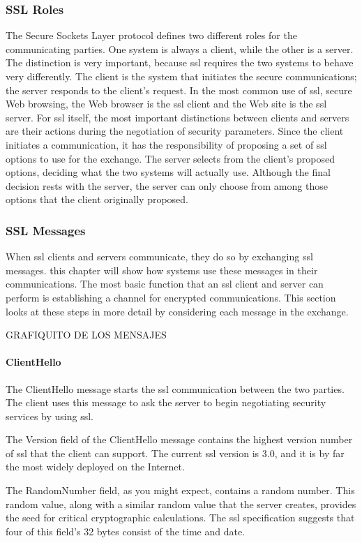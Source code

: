 \subsubsection*{SSL Roles}
The Secure Sockets Layer protocol defines two different roles for the
communicating parties. One system is always a client, while the other
is a server. The distinction is very important, because ssl requires the
two systems to behave very differently. The client is the system that
initiates the secure communications; the server responds to the client’s request. 
In the most common use of ssl, secure Web browsing,
the Web browser is the ssl client and the Web site is the ssl server.
For ssl itself, the most important distinctions between clients and
servers are their actions during the negotiation of security parameters. 
Since the client initiates a communication, it has the
responsibility of proposing a set of ssl options to use for the
exchange. The server selects from the client’s proposed options,
deciding what the two systems will actually use. Although the final
decision rests with the server, the server can only choose from among
those options that the client originally proposed.

\subsubsection*{SSL Messages}
When ssl clients and servers communicate, they do so by exchanging ssl messages. 
this chapter will show how systems use these messages in their communications.
The most basic function that an ssl client and server can perform is
establishing a channel for encrypted communications. 
This section looks at these steps
in more detail by considering each message in the exchange.


GRAFIQUITO DE LOS MENSAJES 

\paragraph*{ClientHello}
The ClientHello message starts the ssl communication between the
two parties. The client uses this message to ask the server to begin
negotiating security services by using ssl. 

The Version field of the ClientHello message contains the highest
version number of ssl that the client can support. The current ssl
version is 3.0, and it is by far the most widely deployed on the Internet. 

The RandomNumber field, as you might expect, contains a random
number. This random value, along with a similar random value that
the server creates, provides the seed for critical cryptographic calculations.
  The ssl specification suggests that
four of this field’s 32 bytes consist of the time and date. 

